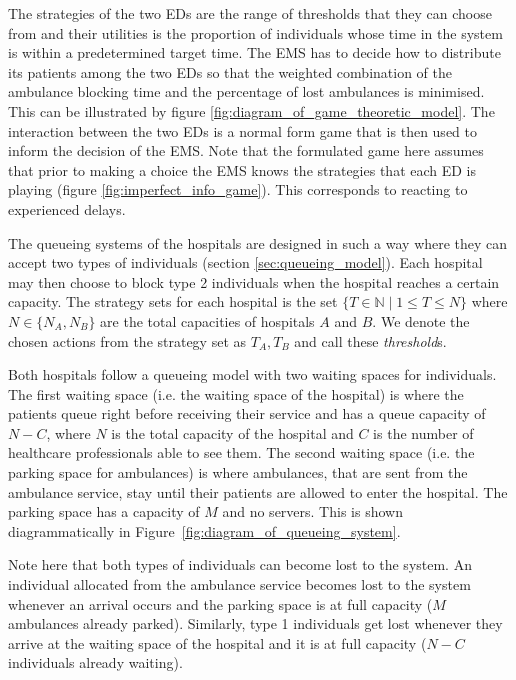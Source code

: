 The strategies of the two EDs are the range of thresholds that they can choose
from and their utilities is the proportion of individuals whose time in the 
system is within a predetermined target time.
The EMS has to decide how to distribute its patients among the two EDs so that 
the weighted combination of the ambulance blocking time and the percentage of 
lost ambulances is minimised. 
This can be illustrated by figure \ref{fig:diagram_of_game_theoretic_model}.
The interaction between the two
EDs is a normal form game that is then used to inform the decision of the EMS.
Note that the formulated game here assumes that prior to making a choice the 
EMS knows the strategies that each ED is playing (figure 
\ref{fig:imperfect_info_game}). 
This corresponds to reacting to experienced delays.



The queueing systems of the hospitals are designed in such a way where they can
accept two types of individuals (section \ref{sec:queueing_model}). 
Each hospital may then choose to block type 2 individuals 
when the hospital reaches a certain capacity. 
The strategy sets for each hospital is the set 
\( \{T \in \mathbb{N} \;|\; 1 \leq T \leq N\} \) where \(N \in\{N_A, N_B\}\) are 
the total capacities of hospitals \(A\) and \(B\). We denote the chosen actions 
from the strategy set as \(T_A, T_B\) and call these \textit{threshold}s.

Both hospitals follow a queueing model with two waiting spaces for 
individuals. 
The first waiting space (i.e. the waiting space of the hospital) is where the 
patients queue right before receiving 
their service and has a queue capacity of \( N - C \), where \(N\) is the total 
capacity of the hospital and \(C\) is the number of healthcare 
professionals able to see them.
The second waiting space (i.e. the parking space for ambulances) is where 
ambulances, that are sent from the
ambulance service, stay until their patients are allowed to enter the hospital.
The parking space has a capacity of \(M\) and no servers.
This is shown diagrammatically in Figure~\ref{fig:diagram_of_queueing_system}.

Note here that both types of individuals can become lost to the system. 
An individual allocated from the ambulance service becomes lost to the system 
whenever 
an arrival occurs and the parking space is at full capacity (\(M\) 
ambulances already parked).
Similarly, type 1 individuals get lost whenever they arrive at the waiting 
space of the hospital and it is at full capacity (\(N - C\) individuals already
waiting).

